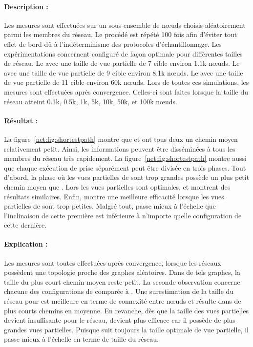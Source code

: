 \paragraph{Description :} Les mesures sont effectuées sur un sous-ensemble de
nœuds choisis aléatoirement parmi les membres du réseau. Le procédé est répété
100 fois afin d'éviter tout effet de bord dû à l'indéterminisme des protocoles
d'échantillonnage. Les expérimentations concernent \CYCLON configuré de façon
optimale pour différentes tailles de réseau. Le \CYCLON avec une taille de vue
partielle de 7 cible environ 1.1k nœuds. Le \CYCLON avec une taille de vue
partielle de 9 cible environ 8.1k nœuds. Le \CYCLON avec une taille de vue
partielle de 11 cible environ 60k nœuds. Lors de toutes ces simulations, les
mesures sont effectuées après convergence. Celles-ci sont faites lorsque la
taille du réseau atteint 0.1k, 0.5k, 1k, 5k, 10k, 50k, et 100k nœuds.

\paragraph{Résultat :} La figure~\ref{net:fig:shortestpath} montre que \CYCLON
et \SPRAY ont tous deux un chemin moyen relativement petit. Ainsi, les
informations peuvent être disséminées à tous les membres du réseau très
rapidement. La figure~\ref{net:fig:shortestpath} montre aussi que chaque
exécution de \CYCLON prise séparément peut être divisée en trois phases.  Tout
d'abord, la phase où les vues partielles de \CYCLON sont trop grandes possède un
plus petit chemin moyen que \SPRAY. Lors les vues partielles sont optimales,
\CYCLON et \SPRAY montrent des résultats similaires. Enfin, \SPRAY montre une
meilleure efficacité lorsque les vues partielles de \CYCLON sont trop
petites. Malgré tout, \SPRAY passe mieux à l'échelle que \CYCLON l'inclinaison
de cette première est inférieure à n'importe quelle configuration de cette
dernière.

\paragraph{Explication :} Les mesures sont toutes effectuées après convergence,
lorsque les réseaux possèdent une topologie proche des graphes aléatoires.  Dans
de tels graphes, la taille du plus court chemin moyen reste petit.  La seconde
observation concerne chacune des configurations de \CYCLON comparée à
\SPRAY. Une surestimation de la taille du réseau pour \CYCLON est meilleure en
terme de connexité entre nœuds et résulte dans de plus courts chemins en
moyenne. En revanche, dès que la taille des vues partielles devient insuffisante
pour le réseau, \SPRAY devient plus efficace car il possède de plus grandes vues
partielles. Puisque \SPRAY suit toujours la taille optimale de vue partielle, il
passe mieux à l'échelle en terme de taille du réseau.

